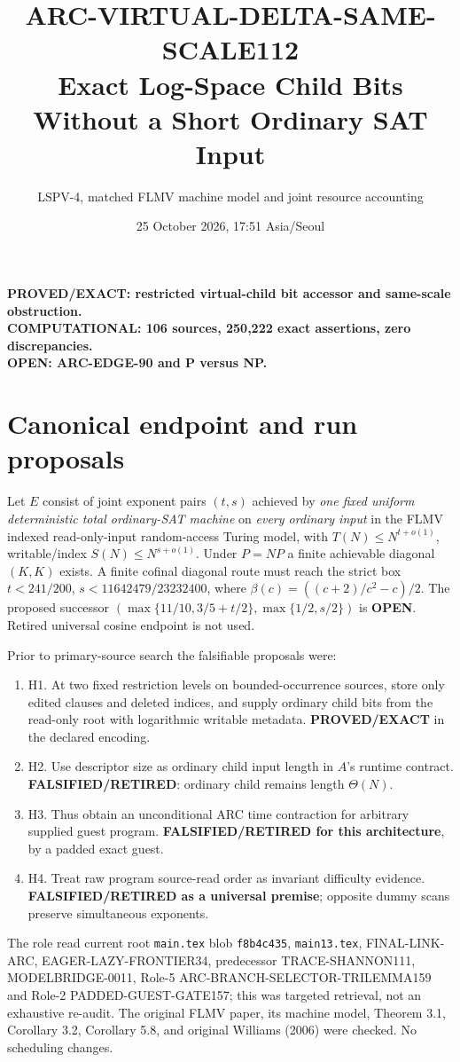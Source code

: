 \documentclass[11pt]{article}
\title{ARC-VIRTUAL-DELTA-SAME-SCALE112\\\large Exact Log-Space Child Bits Without a Short Ordinary SAT Input}
\author{LSPV-4, matched FLMV machine model and joint resource accounting}
\date{25 October 2026, 17:51 Asia/Seoul}
\begin{document}
\maketitle
\begin{center}
\textbf{PROVED/EXACT: restricted virtual-child bit accessor and same-scale obstruction.}\\
\textbf{COMPUTATIONAL: 106 sources, 250,222 exact assertions, zero discrepancies.}\\
\textbf{OPEN: ARC-EDGE-90 and P versus NP.}
\end{center}
\section{Canonical endpoint and run proposals}
Let $E$ consist of joint exponent pairs $(t,s)$ achieved by \emph{one fixed uniform deterministic total ordinary-SAT machine} on \emph{every ordinary input} in the FLMV indexed read-only-input random-access Turing model, with $T(N)\leq N^{t+o(1)}$, writable/index $S(N)\leq N^{s+o(1)}$. Under $P=NP$ a finite achievable diagonal $(K,K)$ exists. A finite cofinal diagonal route must reach the strict box $t<241/200$, $s<11642479/23232400$, where $\beta(c)=((c+2)/c^2-c)/2$. The proposed successor $(\max\{11/10,3/5+t/2\},\max\{1/2,s/2\})$ is \textbf{OPEN}. Retired universal cosine endpoint is not used.

Prior to primary-source search the falsifiable proposals were:
\begin{enumerate}
\item[] H1. At two fixed restriction levels on bounded-occurrence sources, store only edited clauses and deleted indices, and supply ordinary child bits from the read-only root with logarithmic writable metadata. \textbf{PROVED/EXACT} in the declared encoding.
\item[] H2. Use descriptor size as ordinary child input length in $A$'s runtime contract. \textbf{FALSIFIED/RETIRED}: ordinary child remains length $\Theta(N)$.
\item[] H3. Thus obtain an unconditional ARC time contraction for arbitrary supplied guest program. \textbf{FALSIFIED/RETIRED for this architecture}, by a padded exact guest.
\item[] H4. Treat raw program source-read order as invariant difficulty evidence. \textbf{FALSIFIED/RETIRED as a universal premise}; opposite dummy scans preserve simultaneous exponents.
\end{enumerate}
The role read current root \texttt{main.tex} blob \texttt{f8b4c435}, \texttt{main13.tex}, FINAL-LINK-ARC, EAGER-LAZY-FRONTIER34, predecessor TRACE-SHANNON111, MODELBRIDGE-0011, Role-5 ARC-BRANCH-SELECTOR-TRILEMMA159 and Role-2 PADDED-GUEST-GATE157; this was targeted retrieval, not an exhaustive re-audit. The original FLMV paper, its machine model, Theorem 3.1, Corollary 3.2, Corollary 5.8, and original Williams (2006) were checked. No scheduling changes.
\end{document}
